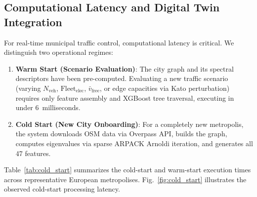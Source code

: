 \documentclass[journal]{IEEEtran}
\begin{document}
\subsection{Computational Latency and Digital Twin Integration}
For real-time municipal traffic control, computational latency is critical. We distinguish two operational regimes:
\begin{enumerate}
    \item \textbf{Warm Start (Scenario Evaluation)}: The city graph and its spectral descriptors have been pre-computed. Evaluating a new traffic scenario (varying $N_{\text{veh}}$, $\text{Fleet}_{\text{elec}}$, $\bar{v}_{\text{free}}$, or edge capacities via Kato perturbation) requires only feature assembly and XGBoost tree traversal, executing in under $6$~milliseconds.
    \item \textbf{Cold Start (New City Onboarding)}: For a completely new metropolis, the system downloads OSM data via Overpass API, builds the graph, computes eigenvalues via sparse ARPACK Arnoldi iteration, and generates all 47 features.
\end{enumerate}

Table~\ref{tab:cold_start} summarizes the cold-start and warm-start execution times across representative European metropolises. Fig.~\ref{fig:cold_start} illustrates the observed cold-start processing latency.

\begin{table}[htbp]
\caption{End-to-End Computational Latency and Resource Breakdown}
\label{tab:cold_start}
\centering
{}
\end{table}
\end{document}
